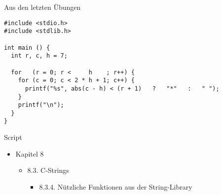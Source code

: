 
\begin{frame}[fragile]{Aus den letzten Übungen}
%
\begin{codebox}
\begin{verbatim}
#include <stdio.h>
#include <stdlib.h>

int main () {
  int r, c, h = 7;
  
  for   (r = 0; r <     h    ; r++) {
    for (c = 0; c < 2 * h + 1; c++) {
      printf("%s", abs(c - h) < (r + 1)   ?   "*"   :   " ");
    }
    printf("\n");
  }
}
\end{verbatim}
\end{codebox}
%
\end{frame}


\begin{frame}{Script}
%
\begin{itemize}
\item Kapitel 8
	\begin{itemize}
	\item 8.3. C-Strings
		\begin{itemize}
		\item 8.3.4. Nützliche Funktionen aus der String-Library
		\end{itemize}
	\end{itemize}
\end{itemize}
%
\end{frame}



